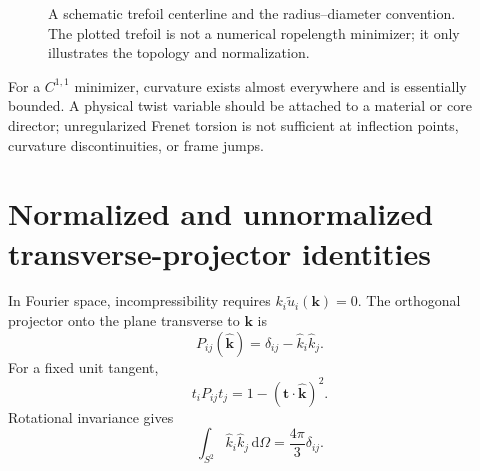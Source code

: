 \documentclass[aps,pre,preprint,notitlepage,nofootinbib,superscriptaddress]{revtex4-2}
\newcommand{\dd}{\mathrm d}
\newcommand{\Rop}{\operatorname{Rop}}
\newcommand{\calL}{\mathcal L}
\newcommand{\unitvec}[1]{\widehat{\bm #1}}
\begin{document}
    \begin{figure}[t]
\centering
{}
\caption{A schematic trefoil centerline and the radius--diameter convention.  The plotted trefoil is not a numerical ropelength minimizer; it only illustrates the topology and normalization.}
\label{fig:trefoil-convention}
\end{figure}

For a $C^{1,1}$ minimizer, curvature exists almost everywhere and is essentially bounded.  A physical twist variable should be attached to a material or core director; unregularized Frenet torsion is not sufficient at inflection points, curvature discontinuities, or frame jumps.

\section{Normalized and unnormalized transverse-projector identities}
\label{sec:projector}

In Fourier space, incompressibility requires $k_i\widetilde u_i(\bm k)=0$.  The orthogonal projector onto the plane transverse to $\bm k$ is
\begin{equation}
  P_{ij}(\unitvec{k})=\delta_{ij}-\widehat k_i\widehat k_j.
  \label{eq:projector-v020}
\end{equation}
For a fixed unit tangent,
\begin{equation}
  t_iP_{ij}t_j=1-(\bm t\cdot\unitvec{k})^2.
\end{equation}
Rotational invariance gives
\begin{equation}
  \int_{S^2}\widehat k_i\widehat k_j\,\dd\Omega
  =\frac{4\pi}{3}\delta_{ij}.
\end{equation}
\end{document}
